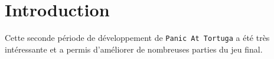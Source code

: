 \documentclass[french, 15pt]{article}
\begin{document}


\tableofcontents
\newpage

\pagestyle{fancy}

\section{Introduction}

Cette seconde période de développement de \texttt{Panic At Tortuga}
a été très intéressante et a permis d'améliorer de nombreuses parties du jeu final.









\newpage
\listoffigures
\listoftables
\end{document}

